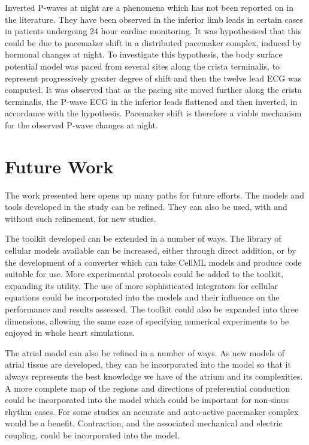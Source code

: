 Inverted P-waves at night are a phenomena which has not been reported on in the
literature.
They have been observed in the inferior limb leads in certain cases in patients
undergoing 24 hour cardiac monitoring.
It was hypothesised that this could be due to pacemaker shift in a distributed
pacemaker complex, induced by hormonal changes at night.
To investigate this hypothesis, the body surface potential model was paced from
several sites along the crista terminalis, to represent progressively greater
degree of shift and then the twelve lead ECG was computed.
It was observed that as the pacing site moved further along the crista
terminalis, the P-wave ECG in the inferior leads flattened and then inverted, in
accordance with the hypothesis.
Pacemaker shift is therefore a viable mechanism for the observed P-wave changes
at night.

\section{Future Work}

The work presented here opens up many paths for future efforts.
The models and tools developed in the study can be refined.
They can also be used, with and without such refinement, for new studies.

The toolkit developed can be extended in a number of ways.
The library of cellular models available can be increased, either through
direct addition, or by the development of a converter which can take CellML
models and produce code suitable for use.
More experimental protocols could be added to the toolkit, expanding its
utility.
The use of more sophisticated integrators for cellular equations could be
incorporated into the models and their influence on the performance and results
assessed.
The toolkit could also be expanded into three dimensions, allowing the same ease
of specifying numerical experiments to be enjoyed in whole heart simulations.

The atrial model can also be refined in a number of ways.
As new models of atrial tissue are developed, they can be incorporated into the
model so that it always represents the best knowledge we have of the atrium and
its complexities.
A more complete map of the regions and directions of preferential conduction
could be incorporated into the model which could be important for non-sinus
rhythm cases.
For some studies an accurate and auto-active pacemaker complex would be a
benefit.
Contraction, and the associated mechanical and electric coupling, could be
incorporated into the model.

